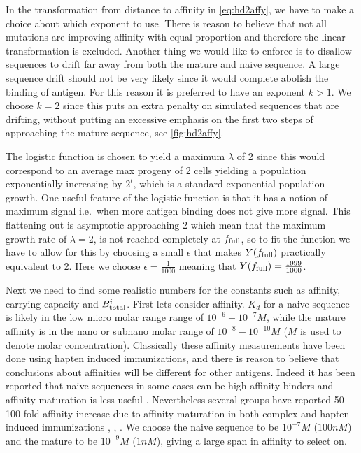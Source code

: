 In the transformation from distance to affinity in \eqref{eq:hd2affy}, we have to make a choice about which exponent to use.
There is reason to believe that not all mutations are improving affinity with equal proportion and therefore the linear transformation is excluded.
Another thing we would like to enforce is to disallow sequences to drift far away from both the mature and naive sequence.
A large sequence drift should not be very likely since it would complete abolish the binding of antigen.
For this reason it is preferred to have an exponent $k>1$.
We choose $k=2$ since this puts an extra penalty on simulated sequences that are drifting, without putting an excessive emphasis on the first two steps of approaching the mature sequence, see \ref{fig:hd2affy}.

The logistic function is chosen to yield a maximum $\lambda$ of 2 since this would correspond to an average max progeny of 2 cells yielding a population exponentially increasing by $2^t$, which is a standard exponential population growth.
One useful feature of the logistic function is that it has a notion of maximum signal i.e.\ when more antigen binding does not give more signal.
This flattening out is asymptotic approaching 2 which mean that the maximum growth rate of $\lambda=2$, is not reached completely at $f_{\text{full}}$, so to fit the function we have to allow for this by choosing a small $\epsilon$ that makes $Y(f_{\text{full}})$ practically equivalent to 2.
Here we choose $\epsilon=\frac{1}{1000}$ meaning that $Y(f_{\text{full}}) = \frac{1999}{1000}$.

Next we need to find some realistic numbers for the constants such as affinity, carrying capacity and $B^i_{\text{total}}$.
First lets consider affinity.
$K_d$ for a naive sequence is likely in the low micro molar range range of $10^{-6} - 10^{-7} M$, while the mature affinity is in the nano or subnano molar range of $10^{-8} - 10^{-10} M$ \cite{berek1987mutation} ($M$ is used to denote molar concentration).
Classically these affinity measurements have been done using hapten induced immunizations, and there is reason to believe that conclusions about affinities will be different for other antigens.
Indeed it has been reported that naive sequences in some cases can be high affinity binders and affinity maturation is less useful \cite{frank2015simple}.
Nevertheless several groups have reported 50-100 fold affinity increase due to affinity maturation in both complex and hapten induced immunizations \cite{Kelsoe_2016}, \cite{phan2006high}, \cite{ulrich1997interplay}.
We choose the naive sequence to be $10^{-7} M$ ($100nM$) and the mature to be $10^{-9} M$ ($1nM$), giving a large span in affinity to select on.

